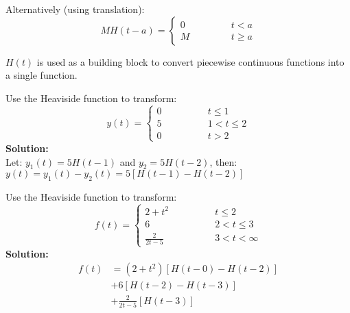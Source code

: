 Alternatively (using translation):
\begin{equation*}
MH(t-a)=
\begin{cases}
0 \qquad \qquad &t<a\\
M &t \geq a
\end{cases}
\end{equation*}

$H(t)$ is used as a building block to convert piecewise continuous functions into a single function.

\begin{exmp}{}
Use the Heaviside function to transform:
\begin{equation*}
y(t)=
\begin{cases}
0 \qquad \qquad &t\leq 1\\
5 &1<t \leq2\\
0&t>2
\end{cases}
\end{equation*}
\textbf{Solution:}\\
Let: $y_1(t)=5H(t-1)$ and $y_2=5H(t-2)$, then: $y(t)=y_1(t)-y_2(t)=5\left[H(t-1)-H(t-2)\right]$
\end{exmp}



\begin{exmp}{}
Use the Heaviside function to transform:
\begin{equation*}
f(t)=
\begin{cases}
2+t^2 \qquad \qquad &t\leq 2\\
6 &2 < t\leq 3\\
\frac{2}{2t-5}&3<t< \infty
\end{cases}
\end{equation*}
\textbf{Solution:}\\
\begin{align*}
f(t)&=(2+t^2)\left[H(t-0)-H(t-2)\right]\\
 &+6\left[H(t-2)-H(t-3)\right]\\
 &+\frac{2}{2t-5}\left[H(t-3)\right]
\end{align*}

\end{exmp}


